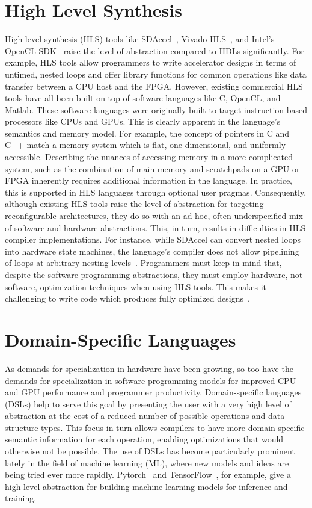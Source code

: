 \section{High Level Synthesis}
High-level synthesis (HLS) tools like SDAccel~\cite{sdaccel}, Vivado HLS~\cite{vivadohls},
and Intel's OpenCL SDK~\cite{opencl_sdk} raise the level of abstraction compared to HDLs significantly.
For example, HLS tools allow programmers to write accelerator designs in terms of untimed, nested loops
and offer library functions for common operations like data transfer between a CPU host and the FPGA.
However, existing commercial HLS tools have all been built on top of software languages like C, OpenCL, and Matlab.
These software languages were originally built to target instruction-based processors like CPUs and GPUs.
This is clearly apparent in the language's semantics and memory model.
For example, the concept of pointers in C and C++ match a memory system which is flat, one dimensional, and uniformly accessible.
Describing the nuances of accessing memory in a more complicated system, such as the combination of main memory and
scratchpads on a GPU or FPGA inherently requires additional information in the language.
In practice, this is supported in HLS languages through optional user pragmas.
Consequently, although existing HLS tools raise the level of abstraction for targeting reconfigurable architectures,
they do so with an ad-hoc, often underspecified mix of software and hardware abstractions.
This, in turn, results in difficulties in HLS compiler implementations.
For instance, while SDAccel can convert nested loops into hardware state machines,
the language's compiler does not allow pipelining of loops at arbitrary nesting levels~\cite{vivado_userguide}.
Programmers must keep in mind that, despite the software programming abstractions, they must employ hardware, not software, optimization techniques when using HLS tools.
This makes it challenging to write code which produces fully optimized designs~\cite{nane2016survey}.

\section{Domain-Specific Languages}
As demands for specialization in hardware have been growing, so too have the demands for
specialization in software programming models for improved CPU and GPU performance and programmer productivity.
Domain-specific languages (DSLs) help to serve this goal by presenting the user with a very high level of abstraction
at the cost of a reduced number of possible operations and data structure types.
This focus in turn allows compilers to have more domain-specific semantic information
for each operation, enabling optimizations that would otherwise not be possible.
The use of DSLs has become particularly prominent lately in the field of machine learning (ML),
where new models and ideas are being tried ever more rapidly. Pytorch~\cite{pytorch} and TensorFlow~\cite{tensorflow},
for example, give a high level abstraction for building machine learning models for inference and training.

